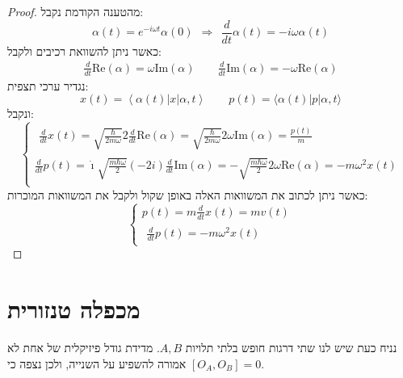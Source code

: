 \documentclass{tstextbook}
\begin{document}
\begin{proof}
מהטענה הקודמת נקבל:
$$\alpha(t)=e^{-i\omega t}\alpha(0)\ \ \Rightarrow\ \ \frac{d}{d t}\alpha(t)=-i\omega\alpha(t)$$
כאשר ניתן להשוואת רכיבים ולקבל:
$$\begin{array}{l}{{\frac{d}{d t}\mathrm{Re}\left( \alpha \right)=\omega\mathrm{Im}\left( \alpha \right)}}\qquad  {{\frac{d}{d t}\mathrm{Im}\left( \alpha \right)=-\omega \mathrm{Re}\left( \alpha \right)}}\end{array}$$
נגדיר ערכי תצפית:
$$x(t)=\left\langle \alpha(t)|x|\alpha,t \right\rangle \qquad p(t)=\langle\alpha(t)|p|\alpha,t\rangle$$
ונקבל:
$$\begin{cases}{\begin{array}{l}{{\frac{d}{d t}}x(t)={\sqrt{{\frac{\hbar}{2m\omega}}}}2{\frac{d}{d t}}\mathrm{Re}\left( \alpha \right)={\sqrt{\frac{\hbar}{2m\omega}}}2\omega \mathrm{Im}\left( \alpha \right)={\frac{p(t)}{m}}}\end{array}} \\\textstyle{\frac{d}{d t}}p(t)={\dot{\imath}}{\sqrt{\frac{m\hbar\omega}{2}}}(-2i){\frac{d}{d t}}\mathrm{Im}\left( \alpha \right)=-{\sqrt{\frac{m\hbar\omega}{2}}}2\omega \mathrm{Re}\left( \alpha \right)=-m\omega^{2}x(t) \\
\end{cases}$$
כאשר ניתן לכתוב את המשוואות האלה באופן שקול ולקבל את המשוואות המוכרות:
$$\begin{cases}p(t)=m{\frac{d}{d t}}x(t)=m v(t) \\{\begin{array}{l}{{\frac{d}{d t}}p(t)=-m\omega^{2}x(t)}\end{array}}
\end{cases}$$

\end{proof}

\section{מכפלה טנזורית}

נניח כעת שיש לנו שתי דרגות חופש בלתי תלויות \(A,B\). מדידת גודל פיזיקלית של אחת לא אמורה להשפיע על השנייה, ולכן נצפה כי \([O_{A},O_{B}]=0\).
\end{document}
